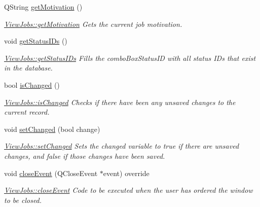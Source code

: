\begin{DoxyCompactItemize}
Q\+String \mbox{\hyperlink{class_view_jobs_a238ec5365ef2c39baa97670769dfedca}{get\+Motivation}} ()
\begin{DoxyCompactList}\small\item\em \mbox{\hyperlink{class_view_jobs_a238ec5365ef2c39baa97670769dfedca}{View\+Jobs\+::get\+Motivation}} Gets the current job motivation. \end{DoxyCompactList}\item 
\mbox{\label{class_view_jobs_adabe196e81c74d17c436de1a6ea12099}} 
void \mbox{\hyperlink{class_view_jobs_adabe196e81c74d17c436de1a6ea12099}{get\+Status\+I\+Ds}} ()
\begin{DoxyCompactList}\small\item\em \mbox{\hyperlink{class_view_jobs_adabe196e81c74d17c436de1a6ea12099}{View\+Jobs\+::get\+Status\+I\+Ds}} Fills the combo\+Box\+Status\+ID with all status I\+Ds that exist in the database. \end{DoxyCompactList}\item 
bool \mbox{\hyperlink{class_view_jobs_a5f75b45d28ce7f4a8050ce9ce0f44350}{is\+Changed}} ()
\begin{DoxyCompactList}\small\item\em \mbox{\hyperlink{class_view_jobs_a5f75b45d28ce7f4a8050ce9ce0f44350}{View\+Jobs\+::is\+Changed}} Checks if there have been any unsaved changes to the current record. \end{DoxyCompactList}\item 
void \mbox{\hyperlink{class_view_jobs_a3cba868c6deadaf4b35c18982f7ec35e}{set\+Changed}} (bool change)
\begin{DoxyCompactList}\small\item\em \mbox{\hyperlink{class_view_jobs_a3cba868c6deadaf4b35c18982f7ec35e}{View\+Jobs\+::set\+Changed}} Sets the changed variable to true if there are unsaved changes, and false if those changes have been saved. \end{DoxyCompactList}\item 
void \mbox{\hyperlink{class_view_jobs_a832503ca9eb4e4bf79c2fb48a59141aa}{close\+Event}} (Q\+Close\+Event $\ast$event) override
\begin{DoxyCompactList}\small\item\em \mbox{\hyperlink{class_view_jobs_a832503ca9eb4e4bf79c2fb48a59141aa}{View\+Jobs\+::close\+Event}} Code to be executed when the user has ordered the window to be closed. \end{DoxyCompactList}\end{DoxyCompactItemize}


